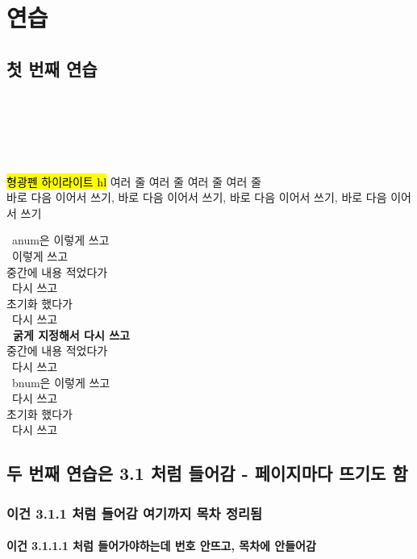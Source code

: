 \chapter{연습}
\section{첫 번째 연습}
   \\
   \\
  \\
 \\
 \\
\hl{형광펜 하이라이트 hl}  여러 줄 여러 줄 여러 줄 여러 줄 \\
바로 다음 이어서 쓰기, 바로 다음 이어서 쓰기, 바로 다음 이어서 쓰기, 바로 다음 이어서 쓰기

\anum\ anum은 이렇게 쓰고 \\
\anum\ 이렇게 쓰고 \\
중간에 내용 적었다가 \\
\anum\ 다시 쓰고 \\
\setcounter{anumcounter}{0}
초기화 했다가 \\
\anum\ 다시 쓰고 \\
\textbf{\anum\ 굵게 지정해서 다시 쓰고} \\
중간에 내용 적었다가 \\
\anum\ 다시 쓰고 \\
\bnum\ bnum은 이렇게 쓰고 \\
\bnum\ 다시 쓰고 \\
\setcounter{bnumcounter}{0}
초기화 했다가 \\
\bnum\ 다시 쓰고 \\

\newpage

\section{두 번째 연습은 3.1 처럼 들어감 - 페이지마다 뜨기도 함}
\subsection{이건 3.1.1 처럼 들어감 여기까지 목차 정리됨}
\subsubsection{이건 3.1.1.1 처럼 들어가야하는데 번호 안뜨고, 목차에 안들어감}

